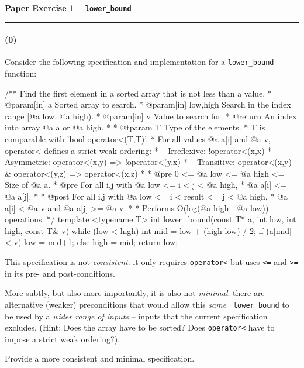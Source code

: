 \documentclass[12pt,letterpaper,twoside]{article}
\begin{document}
{\centering \textbf{Paper Exercise 1 -- {\tt lower\_bound}\\} \par}
\vspace*{-8pt}\noindent\rule{\linewidth}{1pt}
\vspace{-3em}

\paragraph{(0)} Consider the following specification and implementation for a {\tt lower\_bound} function:
\begin{cpp}
/** Find the first element in a sorted array that is not less than a value.
 * @param[in] a         Sorted array to search.
 * @param[in] low,high  Search in the index range [@a low, @a high).
 * @param[in] v         Value to search for.
 * @return  An index into array @a a or @a high.
 *
 * @tparam T Type of the elements. 
 *   T is comparable with 'bool operator<(T,T)'.
 *   For all values @a a[i] and @a v, operator< defines a strict weak ordering:
 *    -- Irreflexive: !operator<(x,x)
 *    -- Asymmetric:   operator<(x,y) => !operator<(y,x)
 *    -- Transitive:   operator<(x,y) & operator<(y,z) => operator<(x,z)
 *
 * @pre  0 <= @a low <= @a high <= Size of @a a.
 * @pre  For all i,j with @a low <= i < j < @a high, 
 *         @a a[i] <= @a a[j].
 *
 * @post For all i,j with @a low <= i < result <= j < @a high, 
 *         @a a[i] < @a v and @a a[j] >= @a v.
 *
 * Performs O(log(@a high - @a low)) operations.
 */
template <typename T>
int lower_bound(const T* a, int low, int high, const T& v) {
   while (low < high) {
      int mid = low + (high-low) / 2;
      if (a[mid] < v)
         low = mid+1;
      else
         high = mid; 
   }
   return low;
}
\end{cpp}
This specification is not {\em consistent}: it only requires {\tt operator<} but
uses {\tt <=} and {\tt >=} in its pre- and post-conditions.

More subtly, but also more importantly, it is also not {\em minimal}: there are
alternative (weaker) preconditions that would allow this {\em same} {\tt
  lower\_bound} to be used by a {\em wider range of inputs} -- inputs that the
current specification excludes. (Hint: Does the array have to be sorted? Does
\texttt{operator<} have to impose a strict weak ordering?).

Provide a more consistent and minimal specification.

\newpage
\end{document}
